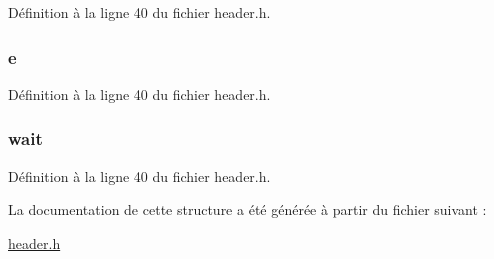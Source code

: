 Définition à la ligne 40 du fichier header.\-h.

\hypertarget{structt__skill__list_aa756d3dbc91762775cff0f4b52526a70}{
\subsubsection[{e}]{ e}}\label{structt__skill__list_aa756d3dbc91762775cff0f4b52526a70}


Définition à la ligne 40 du fichier header.\-h.

\hypertarget{structt__skill__list_a2a4af1a4acb8da6061990f9bd8d0a564}{
\subsubsection[{wait}]{ wait}}\label{structt__skill__list_a2a4af1a4acb8da6061990f9bd8d0a564}


Définition à la ligne 40 du fichier header.\-h.



La documentation de cette structure a été générée à partir du fichier suivant \-:\begin{DoxyCompactItemize}
\item 
\hyperlink{header_8h}{header.\-h}\end{DoxyCompactItemize}

